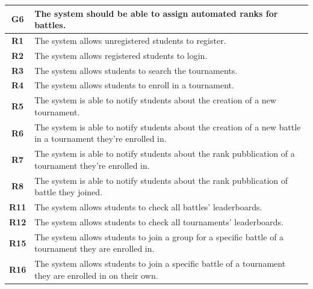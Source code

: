 \documentclass[12pt, a4paper]{report}
\begin{document}
    \begin{table}[H]
        \begin{tabularx}{\textwidth}{cX}
        \textbf{G6}  & The system should be able to assign automated ranks for battles.                                                                 \\ \hline
        \textbf{R1}  & The system allows unregistered students to register.                                                                             \\
        \textbf{R2}  & The system allows registered students to login.                                                                                  \\
        \textbf{R3}  & The system allows students to search the tournaments.                                                                            \\
        \textbf{R4}  & The system allows students to enroll in a tournament.                                                                            \\
        \textbf{R5}  & The system is able to notify students about the creation of a new tournament.                                                    \\
        \textbf{R6}  & The system is able to notify students about the creation of a new battle in a tournament they're enrolled in.                    \\
        \textbf{R7}  & The system is able to notify students about the rank pubblication of a tournament they're enrolled in.                           \\
        \textbf{R8}  & The system is able to notify students about the rank pubblication of battle they joined.                                         \\
        \textbf{R11} & The system allows students to check all battles' leaderboards.                                                                   \\
        \textbf{R12} & The system allows students to check all tournaments' leaderboards.                                                               \\
        \textbf{R15} & The system allows students to join a group for a specific battle of a tournament they are enrolled in.                           \\
        \textbf{R16} & The system allows students to join a specific battle of a tournament they are enrolled in on their own.                          \\

\end{tabularx}
\end{table}
\end{document}
